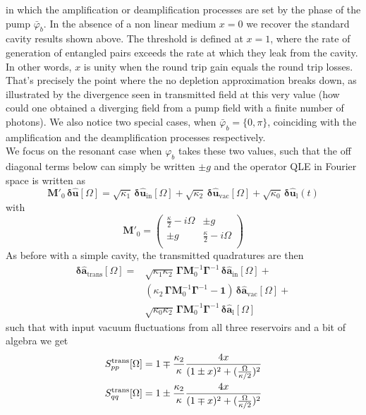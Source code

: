 in which the amplification or deamplification processes are set by the phase of the pump $\bar{\varphi}_b$. In the absence of a non linear medium $x=0$ we recover the standard cavity results shown above. The threshold is defined at $x=1$, where the rate of generation of entangled pairs exceeds the rate at which they leak from the cavity. In other words, $x$ is unity when the round trip gain equals the round trip losses. That's precisely the point where the no depletion approximation breaks down, as illustrated by the divergence seen in transmitted field at this very value (how could one obtained a diverging field from a pump field with a finite number of photons). We also notice two special cases, when $\bar\varphi_b=\{0,\pi\}$, coinciding with the amplification and the deamplification processes respectively. \\
We focus on the resonant case when $\varphi_b$ takes these two values, such that the off diagonal terms below can simply be written $\pm g$ and the operator QLE in Fourier space is written as 
\begin{equation}
     \mathbf{M'}_0 \,  \mathbf{\delta \hat{u}}[\Omega]  = \sqrt{\kappa_{\mathrm{1}}} \, \mathbf{\delta \hat{u}_{\mathrm{in}}}[\Omega]  + \sqrt{\kappa_2} \, \mathbf{\delta \hat{u}_{\mathrm{vac}}}[\Omega]  + \sqrt{\kappa_0} \, \mathbf{\delta \hat{u}_{\mathrm{l}}}(t)  
\end{equation}
with 
\begin{equation}
  \mathbf{M'}_0 =\begin{pmatrix}
  \frac{\kappa}{2}-i\Omega & \pm g\\ 
  \pm g  & \frac{\kappa}{2}-i\Omega\\ 
  \end{pmatrix} 
\end{equation}
As before with a simple cavity, the transmitted quadratures are then 
\begin{equation}
\begin{split}
  \mathbf{\delta \hat{a}_{\mathrm{trans}}}[\Omega]  = &\sqrt{\kappa_1 \kappa_2} \, \mathbf{\Gamma} \mathbf{M}^{-1}_0\mathbf{\Gamma}^{-1}\, \mathbf{\delta \hat{a}_{\mathrm{in}}}[\Omega] + \\
  &  (\kappa_2 \,\mathbf{\Gamma}  \mathbf{M}^{-1}_0 \mathbf{\Gamma}^{-1}- \mathbf{1}) \, \mathbf{\delta \hat{a}_{\mathrm{vac}}}[\Omega] +\\
  & \sqrt{\kappa_0 \kappa_2} \, \mathbf{\Gamma} \mathbf{M}^{-1}_0\mathbf{\Gamma}^{-1}\,\mathbf{\delta \hat{a}_{\mathrm{l}}}[\Omega]
\end{split}
\end{equation}
such that with input vacuum fluctuations from all three reservoirs and a bit of algebra we get 
\begin{equation}
  \begin{split}
    S_{pp}^{\rm trans}[\Omega] &= 1 \mp \frac{\kappa_2}{\kappa} \frac{4x}{(1\pm x)^2+ (\frac{\Omega}{\kappa/2})^2}\\
    S_{qq}^{\rm trans}[\Omega]&=  1 \pm \frac{\kappa_2}{\kappa} \frac{4x}{(1\mp x)^2+ (\frac{\Omega}{\kappa/2})^2}
  \end{split}
\end{equation}
